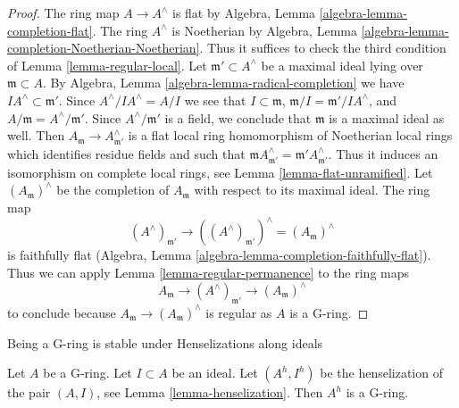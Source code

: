 \begin{proof}
The ring map $A \to A^\wedge$ is flat by
Algebra, Lemma \ref{algebra-lemma-completion-flat}.
The ring $A^\wedge$ is Noetherian by
Algebra, Lemma \ref{algebra-lemma-completion-Noetherian-Noetherian}.
Thus it suffices to check the third condition of
Lemma \ref{lemma-regular-local}.
Let $\mathfrak m' \subset A^\wedge$ be a maximal ideal lying over
$\mathfrak m \subset A$.
By Algebra, Lemma \ref{algebra-lemma-radical-completion}
we have $IA^\wedge \subset \mathfrak m'$.
Since $A^\wedge/IA^\wedge = A/I$ we see that
$I \subset \mathfrak m$, $\mathfrak m/I = \mathfrak m'/IA^\wedge$, and
$A/\mathfrak m = A^\wedge/\mathfrak m'$. Since $A^\wedge/\mathfrak m'$
is a field, we conclude that $\mathfrak m$ is a maximal ideal as well.
Then $A_\mathfrak m \to A^\wedge_{\mathfrak m'}$ is a flat local
ring homomorphism of Noetherian local rings
which identifies residue fields and such that
$\mathfrak m A^\wedge_{\mathfrak m'} = \mathfrak m'A^\wedge_{\mathfrak m'}$.
Thus it induces an isomorphism on complete local rings, see
Lemma \ref{lemma-flat-unramified}.
Let $(A_\mathfrak m)^\wedge$ be the completion of $A_\mathfrak m$
with respect to its maximal ideal.
The ring map
$$
(A^\wedge)_{\mathfrak m'} \to
((A^\wedge)_{\mathfrak m'})^\wedge = (A_\mathfrak m)^\wedge
$$
is faithfully flat (Algebra, Lemma
\ref{algebra-lemma-completion-faithfully-flat}). Thus we can apply
Lemma \ref{lemma-regular-permanence} to the ring maps
$$
A_\mathfrak m \to (A^\wedge)_{\mathfrak m'} \to (A_\mathfrak m)^\wedge
$$
to conclude because $A_\mathfrak m \to (A_\mathfrak m)^\wedge$
is regular as $A$ is a G-ring.
\end{proof}

\begin{lemma}
\label{lemma-henselization-pair-G-ring}
\begin{slogan}
Being a G-ring is stable under Henselizations along ideals
\end{slogan}
\begin{reference}
\cite[Theorem 5.3 i)]{Greco}
\end{reference}
Let $A$ be a G-ring. Let $I \subset A$ be an ideal.
Let $(A^h, I^h)$ be the henselization of the pair $(A, I)$, see
Lemma \ref{lemma-henselization}.
Then $A^h$ is a G-ring.
\end{lemma}

